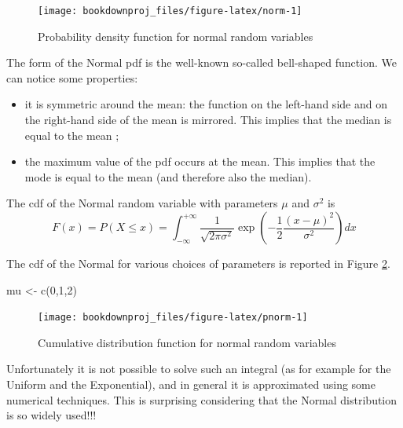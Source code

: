 \documentclass[
]{book}
\newenvironment{Shaded}{\begin{snugshade}}{\end{snugshade}}
\newcommand{\DecValTok}[1]{\textcolor[rgb]{0.00,0.00,0.81}{#1}}
\newcommand{\FunctionTok}[1]{\textcolor[rgb]{0.00,0.00,0.00}{#1}}
\newcommand{\NormalTok}[1]{#1}
\newcommand{\OtherTok}[1]{\textcolor[rgb]{0.56,0.35,0.01}{#1}}
\theoremstyle{definition}
\theoremstyle{definition}
\theoremstyle{definition}
\theoremstyle{definition}
\theoremstyle{remark}
\begin{document}
\begin{figure}

{\centering \texttt{[image: bookdownproj\_files/figure-latex/norm-1]} 

}

\caption{Probability density function for normal random variables}\label{fig:norm}
\end{figure}

The form of the Normal pdf is the well-known so-called bell-shaped function. We can notice some properties:

\begin{itemize}
\item
  it is symmetric around the mean: the function on the left-hand side and on the right-hand side of the mean is mirrored. This implies that the median is equal to the mean ;
\item
  the maximum value of the pdf occurs at the mean. This implies that the mode is equal to the mean (and therefore also the median).
\end{itemize}

The cdf of the Normal random variable with parameters \(\mu\) and \(\sigma^2\) is
\[
F(x) = P(X\leq x)=\int_{-\infty}^{+\infty}\frac{1}{\sqrt{2\pi\sigma^2}}\exp\left(-\frac{1}{2}\frac{(x-\mu)^2}{\sigma^2}\right)dx
\]

The cdf of the Normal for various choices of parameters is reported in Figure \ref{fig:pnorm}.

\begin{Shaded}
\begin{Highlighting}[]
\NormalTok{mu }\OtherTok{\textless{}{-}} \FunctionTok{c}\NormalTok{(}\DecValTok{0}\NormalTok{,}\DecValTok{1}\NormalTok{,}\DecValTok{2}\NormalTok{)}
\end{Highlighting}
\end{Shaded}

\begin{figure}

{\centering \texttt{[image: bookdownproj\_files/figure-latex/pnorm-1]} 

}

\caption{Cumulative distribution function for normal random variables}\label{fig:pnorm}
\end{figure}

Unfortunately it is not possible to solve such an integral (as for example for the Uniform and the Exponential), and in general it is approximated using some numerical techniques. This is surprising considering that the Normal distribution is so widely used!!!
\end{document}
